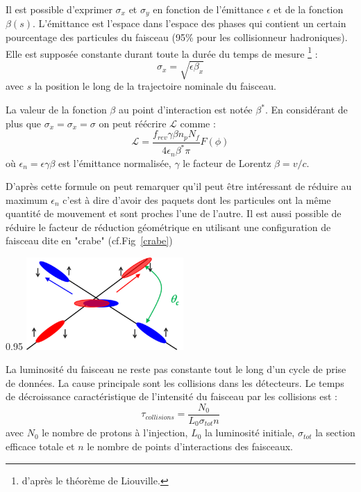 Il est possible d'exprimer $\sigma_{x}$ et $\sigma_{y}$ en fonction de l'émittance $\epsilon$ et de la fonction $\beta(s)$. L'émittance est l'espace dans l'espace des phases qui contient un certain pourcentage des particules du faisceau (\num{95}\% pour les collisionneur hadroniques). Elle est supposée constante durant toute la durée du temps de mesure \footnote{d'après le théorème de Liouville.} :
\begin{equation}
\sigma_{x}=\sqrt{\epsilon\beta_{x}}
\end{equation}
avec $s$ la position le long de la trajectoire nominale du faisceau.

La valeur de la fonction $\beta$ au point d'interaction est notée $\beta^{*}$. En considérant de plus que $\sigma_{x}=\sigma_{x}=\sigma$ on peut réécrire $\mathcal{L}$ comme :
\begin{equation}
\mathcal{L}=\frac{f_{rev}\gamma\beta n_{p}N_{f}}{4\epsilon_{n}\beta^{*}\pi} F(\phi)
\end{equation}
où $\epsilon_{n}=\epsilon\gamma\beta$ est l'émittance normalisée, $\gamma$ le facteur de Lorentz $\beta=v/c$.

D'après cette formule on peut remarquer qu'il peut être intéressant de réduire au maximum $\epsilon_{n}$ c'est à dire d'avoir des paquets dont les particules ont la même quantité de mouvement et sont proches l'une de l'autre. Il est aussi possible de réduire le facteur de réduction géométrique en utilisant une configuration de faisceau dite en "crabe" (cf.Fig~\ref{crabe})

\begin{minipagewithmarginpars}[ht!]{0.95\textwidth}
\centering
\includegraphics[width=0.45\textwidth]{LHC/crab.png}
\label{crabe}	
\end{minipagewithmarginpars}

La luminosité du faisceau ne reste pas constante tout le long d'un cycle de prise de données. La cause principale sont les collisions dans les détecteurs. Le temps de décroissance caractéristique de l'intensité du faisceau par les collisions est :
\begin{equation}
\tau_{collisions}=\frac{N_{0}}{L_{0}\sigma_{tot}n}
\end{equation}
avec $N_{0}$ le nombre de protons à l'injection, $L_{0}$ la luminosité initiale, $\sigma_{tot}$ la section efficace totale et $n$ le nombre de points d'interactions des faisceaux.

